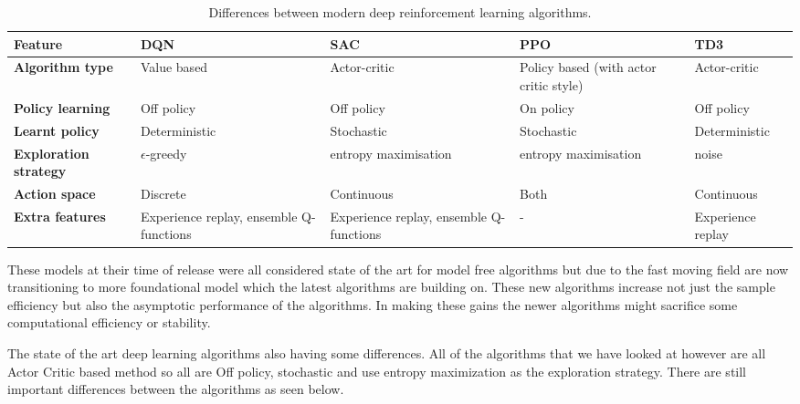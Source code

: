 \begin{table}[h]
    \footnotesize
    \centering
    \renewcommand{\arraystretch}{1.4} %
    \begin{tabularx}{\textwidth}{p{1.3cm} X X X X}
        \hline
        \textbf{Feature} & \textbf{DQN} & \textbf{SAC} & \textbf{PPO} & \textbf{TD3} \\
        \hline
        \textbf{Algorithm type}       & Value based      & Actor-critic         & Policy based (with actor critic style)              & Actor-critic  \\
        \textbf{Policy learning}      & Off policy        & Off policy           & On policy            & Off policy    \\
        \textbf{Learnt policy}        & Deterministic     & Stochastic           & Stochastic           & Deterministic \\
        \textbf{Exploration strategy} & $\epsilon$-greedy & entropy maximisation & entropy maximisation & noise         \\
        \textbf{Action space}         & Discrete          & Continuous           & Both                 & Continuous    \\
        \textbf{Extra features} & Experience replay, ensemble Q-functions & Experience replay, ensemble Q-functions & - & Experience replay \\
        \hline
    \end{tabularx}
    \caption{Differences between modern deep reinforcement learning algorithms.}
\end{table}
These models at their time of release were all considered state of the art for model free algorithms but due to the fast moving field are now transitioning to more foundational model which the latest algorithms are building on. These new algorithms increase not just the sample efficiency but also the asymptotic performance of the algorithms. In making these gains the newer algorithms might sacrifice some computational efficiency or stability.

The state of the art deep learning algorithms also having some differences. All of the algorithms that we have looked at however are all Actor Critic based method so all are Off policy, stochastic and use entropy maximization as the exploration strategy. There are still important differences between the algorithms as seen below.

